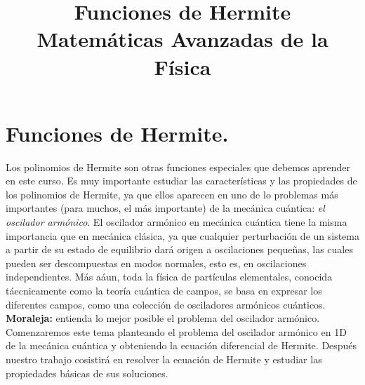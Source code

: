 
\usepackage{mathrsfs}
\usepackage{bigints}
\newcommand{\saltosin}{\nonumber \\}
\title{Funciones de Hermite \\ {\large Matemáticas Avanzadas de la Física}}
\date{ }

\renewcommand\labelenumii{\theenumi.{\arabic{enumii}}}
\maketitle
\fontsize{14}{14}\selectfont
\section{Funciones de Hermite.}
Los polinomios de Hermite son otras funciones especiales que debemos aprender en este curso. Es muy importante estudiar las características y las propiedades de los polinomios de Hermite, ya que ellos aparecen en uno de lo problemas más importantes (para muchos, el más importante) de la mecánica cuántica: \emph{el oscilador armónico}. El oscilador armónico en mecánica cuántica tiene la misma importancia que en mecánica clásica, ya que cualquier perturbación de un sistema a partir de su estado de equilibrio dará origen a oscilaciones pequeñas, las cuales pueden ser descompuestas en modos
normales, esto es, en oscilaciones independientes. Más aáun, toda la física de partículas elementales, conocida táecnicamente como la teoría cuántica de campos, se basa en expresar los diferentes campos, como una colección de osciladores armónicos cuánticos. \textbf{Moraleja: } entienda lo mejor posible el problema del oscilador armónico.
\\
Comenzaremos este tema planteando el problema del oscilador armónico en 1D de la mecánica cuántica y obteniendo la ecuación diferencial de Hermite. Después nuestro trabajo cosistirá en resolver la ecuación de Hermite y estudiar las propiedades básicas de sus soluciones.
\\
